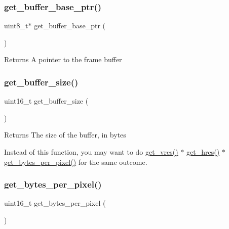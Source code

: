 \subsubsection{\texorpdfstring{get\+\_\+buffer\+\_\+base\+\_\+ptr()}{get\_buffer\_base\_ptr()}}
{\footnotesize\ttfamily uint8\+\_\+t$\ast$ get\+\_\+buffer\+\_\+base\+\_\+ptr (\begin{DoxyParamCaption}{ }\end{DoxyParamCaption})}

\begin{DoxyReturn}{Returns}
A pointer to the frame buffer 
\end{DoxyReturn}
\mbox{\label{group__video__card_ga3ff6bb40b256e97af89a53bd459b59f5}} 
\subsubsection{\texorpdfstring{get\+\_\+buffer\+\_\+size()}{get\_buffer\_size()}}
{\footnotesize\ttfamily uint16\+\_\+t get\+\_\+buffer\+\_\+size (\begin{DoxyParamCaption}{ }\end{DoxyParamCaption})}

\begin{DoxyReturn}{Returns}
The size of the buffer, in bytes
\end{DoxyReturn}
Instead of this function, you may want to do \hyperlink{group__video__card_gad5999dee7ae30ea14b13e2e2e5a92c88}{get\+\_\+vres()} $\ast$ \hyperlink{group__video__card_ga8becb86f48f701c43e1c411f57f60c4d}{get\+\_\+hres()} $\ast$ \hyperlink{group__video__card_ga9f914dcc3574459a6f0f5fa903ad40e7}{get\+\_\+bytes\+\_\+per\+\_\+pixel()} for the same outcome. \mbox{\label{group__video__card_ga9f914dcc3574459a6f0f5fa903ad40e7}} 
\subsubsection{\texorpdfstring{get\+\_\+bytes\+\_\+per\+\_\+pixel()}{get\_bytes\_per\_pixel()}}
{\footnotesize\ttfamily uint16\+\_\+t get\+\_\+bytes\+\_\+per\+\_\+pixel (\begin{DoxyParamCaption}{ }\end{DoxyParamCaption})}

